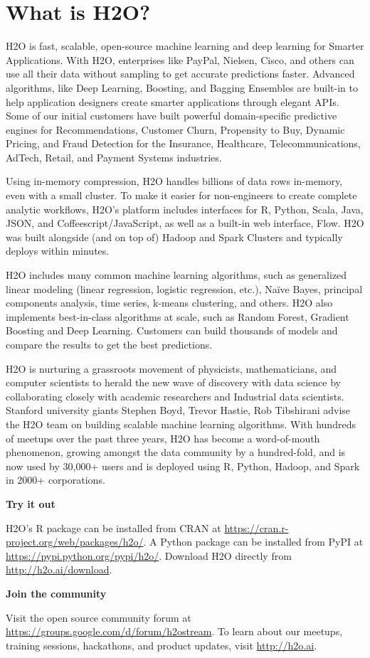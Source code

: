 \section{What is H2O?}

H2O is fast, scalable, open-source machine learning and deep learning for Smarter Applications. With H2O, enterprises like PayPal, Nielsen, Cisco, and others can use all their data without sampling to get accurate predictions faster. Advanced algorithms, like Deep Learning, Boosting, and Bagging Ensembles are built-in to help application designers create smarter applications through elegant APIs. Some of our initial customers have built powerful domain-specific predictive engines for Recommendations, Customer Churn, Propensity to Buy, Dynamic Pricing, and Fraud Detection for the Insurance, Healthcare, Telecommunications, AdTech, Retail, and Payment Systems industries.

Using in-memory compression, H2O handles billions of data rows in-memory, even with a small cluster. To make it easier for non-engineers to create complete analytic workflows, H2O's platform includes interfaces for R, Python, Scala, Java, JSON, and Coffeescript/JavaScript, as well as a built-in  web interface, Flow. H2O was built alongside (and on top of) Hadoop and Spark Clusters and typically deploys within minutes.

H2O includes many common machine learning algorithms, such as generalized linear modeling (linear regression, logistic regression, etc.), Na\"{i}ve Bayes, principal components analysis, time series, k-means clustering, and others. H2O also implements best-in-class algorithms at scale, such as Random Forest, Gradient Boosting and Deep Learning. Customers can build thousands of models and compare the results to get the best predictions.

H2O is nurturing a grassroots movement of physicists, mathematicians, and computer scientists to herald the new wave of discovery with data science by collaborating closely with academic researchers and Industrial data scientists. Stanford university giants Stephen Boyd, Trevor Hastie, Rob Tibshirani advise the H2O team on building scalable machine learning algorithms. With hundreds of meetups over the past three years, H2O has become a word-of-mouth phenomenon, growing amongst the data community by a hundred-fold, and is now used by 30,000+ users and is deployed using R, Python, Hadoop, and Spark in 2000+ corporations.

\textbf{Try it out}

H2O's R package can be installed from CRAN at {\url{https://cran.r-project.org/web/packages/h2o/}}. A Python package can be installed from PyPI at {\url{https://pypi.python.org/pypi/h2o/}}. Download H2O directly from \mbox{\url{http://h2o.ai/download}}.

\textbf{Join the community}

Visit the open source community forum at \mbox{\url{https://groups.google.com/d/forum/h2ostream}}. To learn about our meetups, training sessions, hackathons, and product updates, visit \mbox{\url{http://h2o.ai}}. 

